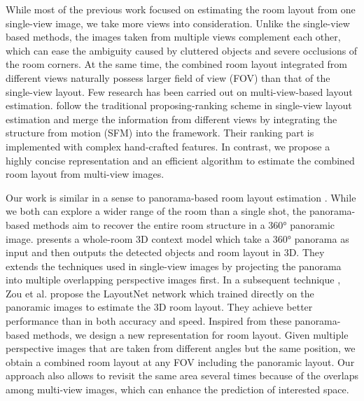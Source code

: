 %
While most of the previous work focused on estimating the room layout from one single-view image, we take more views into consideration. Unlike the single-view based methods, the images taken from multiple views complement each other, which can ease the ambiguity caused by cluttered objects and severe occlusions of the room corners. At the same time, the combined room layout integrated from different views naturally possess larger field of view (FOV) than that of the single-view layout. 
%
%
Few research has been carried out on multi-view-based layout estimation. \cite{bao2014understanding} follow the traditional proposing-ranking scheme in single-view layout estimation and merge the information from different views by integrating the structure from motion (SFM) into the framework. Their ranking part is implemented with complex hand-crafted features. 
%
In contrast, we propose a highly concise representation and an efficient algorithm to estimate the combined room layout from multi-view images.

%
Our work is similar in a sense to panorama-based room layout estimation \cite{zhang2014panocontext,zou2018layoutnet}. While we both can explore a wider range of the room than a single shot, the panorama-based methods aim to recover the entire room structure in a \ang{360} panoramic image. 
%
\cite{zhang2014panocontext} presents a whole-room 3D context model which take a \ang{360} panorama as input and then outputs the detected objects and room layout in 3D. 
They extends the techniques used in single-view images by projecting the panorama into multiple overlapping perspective images first. 
In a subsequent technique \cite{zou2018layoutnet}, Zou et al. propose the LayoutNet network which trained directly on the panoramic images to estimate the 3D room layout. They achieve better performance than \cite{zhang2014panocontext} in both accuracy and speed.
%
Inspired from these panorama-based methods, we design a new representation for room layout. Given multiple perspective images that are taken from different angles but the same position, we obtain a combined room layout at any FOV including the panoramic layout. Our approach also allows to revisit the same area several times because of the overlaps among multi-view images, which can enhance the prediction of interested space.

